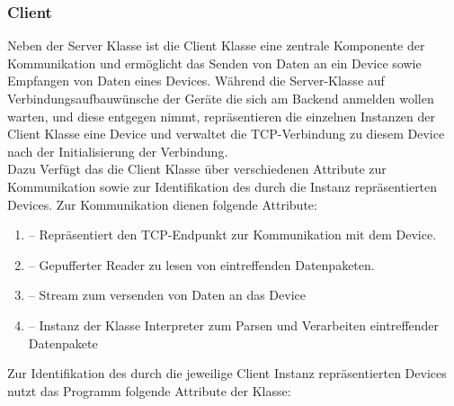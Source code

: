\subsubsection{Client}
Neben der Server Klasse ist die Client Klasse eine zentrale Komponente der Kommunikation und ermöglicht das Senden von Daten an ein Device 
sowie Empfangen von Daten eines Devices.
Während die Server-Klasse auf Verbindungsaufbauwünsche der Geräte die sich am Backend anmelden wollen warten, und diese entgegen nimmt, 
repräsentieren die einzelnen Instanzen der Client Klasse eine Device und verwaltet die TCP-Verbindung zu diesem Device nach der Initialisierung
der Verbindung. \\
Dazu Verfügt das die Client Klasse über verschiedenen Attribute zur Kommunikation sowie zur Identifikation des durch die Instanz repräsentierten
Devices. Zur Kommunikation dienen folgende Attribute:
\begin{enumerate}
	\item{} -- Repräsentiert den TCP-Endpunkt zur Kommunikation mit dem Device.
	\item{} -- Gepufferter Reader zu lesen von eintreffenden Datenpaketen.
	\item{} -- Stream zum versenden von Daten an das Device
	\item{} -- Instanz der Klasse Interpreter zum Parsen und Verarbeiten eintreffender Datenpakete
\end{enumerate}
Zur Identifikation des durch die jeweilige Client Instanz repräsentierten Devices nutzt das Programm folgende Attribute der Klasse:
